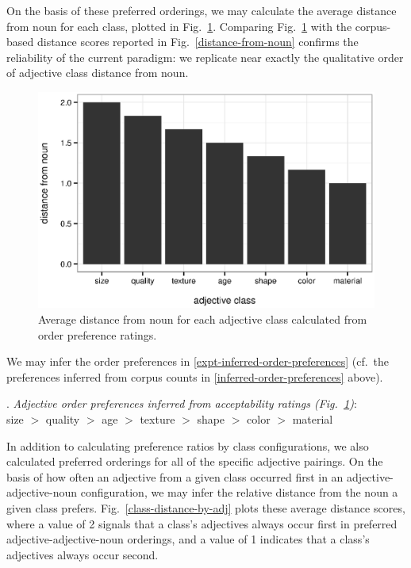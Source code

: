 \documentclass[11pt]{article}
\begin{document}
On the basis of these preferred orderings, we may calculate the average distance from noun for each class, plotted in Fig.~\ref{class-distance}. Comparing Fig.~\ref{class-distance} with the corpus-based distance scores reported in Fig.~\ref{distance-from-noun} confirms the reliability of the current paradigm: we replicate near exactly the qualitative order of adjective class distance from noun. 

\begin{figure}[h!]
	\centering
	\includegraphics[width=.8\linewidth]{plots/class_distance.eps}
	\caption{Average distance from noun for each adjective class calculated from order preference ratings.}\label{class-distance}
\end{figure}

We may infer the order preferences in \ref{expt-inferred-order-preferences} (cf.~the preferences inferred from corpus counts in \ref{inferred-order-preferences} above).

\ex. \label{expt-inferred-order-preferences}
\emph{Adjective order preferences inferred from acceptability ratings (Fig.~\ref{class-distance})}:\\
size $>$ quality $>$ age $>$ texture $>$ shape $>$ color $>$ material

In addition to calculating preference ratios by class configurations, we also calculated preferred orderings for all of the specific adjective pairings. On the basis of how often an adjective from a given class occurred first in an adjective-adjective-noun configuration, we may infer the relative distance from the noun a given class prefers. Fig.~\ref{class-distance-by-adj} plots these average distance scores, where a value of 2 signals that a class's adjectives always occur first in preferred adjective-adjective-noun orderings, and a value of 1 indicates that a class's adjectives always occur second.
\end{document}
